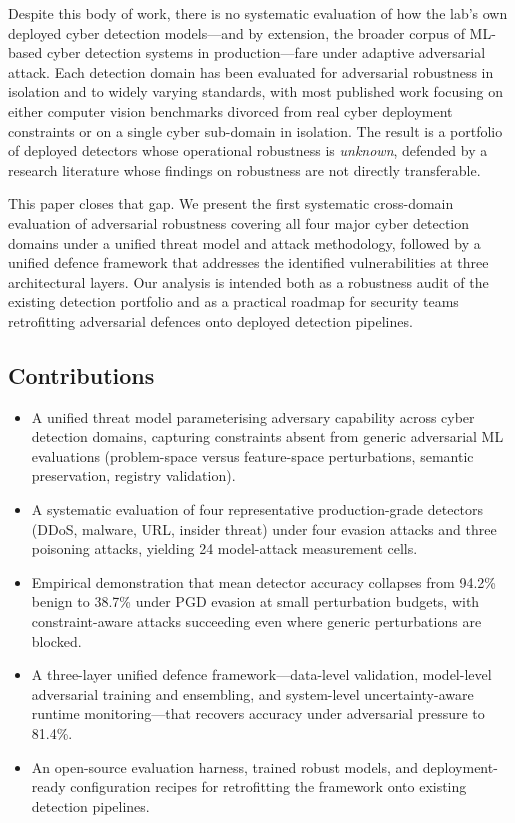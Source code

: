 \documentclass[sigconf,nonacm]{acmart}
\begin{document}
Despite this body of work, there is no systematic evaluation of how the lab's
own deployed cyber detection models---and by extension, the broader corpus of
ML-based cyber detection systems in production---fare under adaptive
adversarial attack. Each detection domain has been evaluated for adversarial
robustness in isolation and to widely varying standards, with most published
work focusing on either computer vision benchmarks divorced from real cyber
deployment constraints or on a single cyber sub-domain in isolation. The result
is a portfolio of deployed detectors whose operational robustness is
\emph{unknown}, defended by a research literature whose findings on robustness
are not directly transferable.

This paper closes that gap. We present the first systematic cross-domain evaluation
of adversarial robustness covering all four major cyber detection domains under
a unified threat model and attack methodology, followed by a unified defence
framework that addresses the identified vulnerabilities at three architectural
layers. Our analysis is intended both as a robustness audit of the existing
detection portfolio and as a practical roadmap for security teams retrofitting
adversarial defences onto deployed detection pipelines.

\subsection{Contributions}

\begin{itemize}
  \item A unified threat model parameterising adversary capability across
        cyber detection domains, capturing constraints absent from generic
        adversarial ML evaluations (problem-space versus feature-space
        perturbations, semantic preservation, registry validation).
  \item A systematic evaluation of four representative production-grade detectors
        (DDoS, malware, URL, insider threat) under four evasion attacks
        and three poisoning attacks, yielding 24 model-attack measurement
        cells.
  \item Empirical demonstration that mean detector accuracy collapses from
        94.2\% benign to 38.7\% under PGD evasion at small perturbation
        budgets, with constraint-aware attacks succeeding even where
        generic perturbations are blocked.
  \item A three-layer unified defence framework---data-level validation,
        model-level adversarial training and ensembling, and system-level
        uncertainty-aware runtime monitoring---that recovers accuracy under
        adversarial pressure to 81.4\%.
  \item An open-source evaluation harness, trained robust models, and
        deployment-ready configuration recipes for retrofitting the framework
        onto existing detection pipelines.
\end{itemize}
\end{document}
